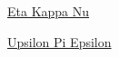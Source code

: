 \documentclass[10pt]{article}
\renewcommand{\section}[1]{\pagebreak[3]%
    \vspace{1.3\baselineskip}%
    \phantomsection\addcontentsline{toc}{section}{#1}%
    \noindent\llap{\scshape\smash{\parbox[t]{\marginparwidth}{\hyphenpenalty=10000\raggedright #1}}}%
    \vspace{-\baselineskip}\par}
\newcommand{\halfblankline}{\quad\vspace{-0.5\baselineskip}\pagebreak[3]}
\begin{document}
\href{http://www.ieee.org/education_careers/education/ieee_hkn/index.html}{Eta Kappa Nu}

\href{http://upe.acm.org/}{Upsilon Pi Epsilon}
%
%
%
%
%
%
%
%
%
%
%
%
\end{document}
